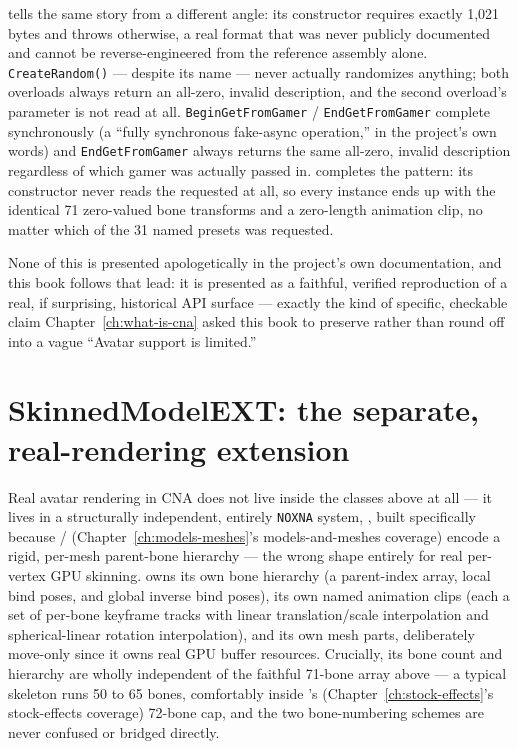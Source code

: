  tells the same story from a different angle: its constructor
requires exactly 1{,}021 bytes and throws otherwise, a real format that was never publicly
documented and cannot be reverse-engineered from the reference assembly alone.
\texttt{CreateRandom()} --- despite its name --- never actually randomizes anything; both
overloads always return an all-zero, invalid description, and the second overload's
 parameter is not read at all. \texttt{BeginGetFromGamer} /
\texttt{EndGetFromGamer} complete synchronously (a ``fully synchronous fake-async
operation,'' in the project's own words) and \texttt{EndGetFromGamer} always returns the same
all-zero, invalid description regardless of which gamer was actually passed in.
 completes the pattern: its constructor never reads the requested
 at all, so every instance ends up with the identical 71
zero-valued bone transforms and a zero-length animation clip, no matter which of the 31 named
presets was requested.

None of this is presented apologetically in the project's own documentation, and this book
follows that lead: it is presented as a faithful, verified reproduction of a real, if
surprising, historical API surface --- exactly the kind of specific, checkable claim
Chapter~\ref{ch:what-is-cna} asked this book to preserve rather than round off into a vague ``Avatar
support is limited.''

\section{SkinnedModelEXT: the separate, real-rendering extension}

Real avatar rendering in CNA does not live inside the classes above at all --- it lives in a
structurally independent, entirely \texttt{NOXNA} system, , built
specifically because  /  (Chapter~\ref{ch:models-meshes}'s models-and-meshes
coverage) encode a rigid, per-mesh parent-bone hierarchy --- the wrong shape entirely for
real per-vertex GPU skinning.  owns its own bone hierarchy (a
parent-index array, local bind poses, and global inverse bind poses), its own named animation
clips (each a set of per-bone keyframe tracks with linear translation/scale interpolation and
spherical-linear rotation interpolation), and its own mesh parts, deliberately move-only since
it owns real GPU buffer resources. Crucially, its bone count and hierarchy are wholly
independent of the faithful 71-bone  array above --- a typical
 skeleton runs 50 to 65 bones, comfortably inside
's (Chapter~\ref{ch:stock-effects}'s stock-effects coverage) 72-bone cap, and the
two bone-numbering schemes are never confused or bridged directly.

